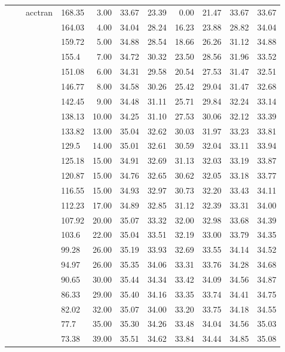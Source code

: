 \begin{longtable}{llllrrrrrrr}
   &  & acctran & 168.35 & 3.00 & 33.67 & 23.39 & 0.00 & 21.47 & 33.67 & 33.67 \\ 
   &  &  & 164.03 & 4.00 & 34.04 & 28.24 & 16.23 & 23.88 & 28.82 & 34.04 \\ 
   &  &  & 159.72 & 5.00 & 34.88 & 28.54 & 18.66 & 26.26 & 31.12 & 34.88 \\ 
   &  &  & 155.4 & 7.00 & 34.72 & 30.32 & 23.50 & 28.56 & 31.96 & 33.52 \\ 
   &  &  & 151.08 & 6.00 & 34.31 & 29.58 & 20.54 & 27.53 & 31.47 & 32.51 \\ 
   &  &  & 146.77 & 8.00 & 34.58 & 30.26 & 25.42 & 29.04 & 31.47 & 32.68 \\ 
   &  &  & 142.45 & 9.00 & 34.48 & 31.11 & 25.71 & 29.84 & 32.24 & 33.14 \\ 
   &  &  & 138.13 & 10.00 & 34.25 & 31.10 & 27.53 & 30.06 & 32.12 & 33.39 \\ 
   &  &  & 133.82 & 13.00 & 35.04 & 32.62 & 30.03 & 31.97 & 33.23 & 33.81 \\ 
   &  &  & 129.5 & 14.00 & 35.01 & 32.61 & 30.59 & 32.04 & 33.11 & 33.94 \\ 
   &  &  & 125.18 & 15.00 & 34.91 & 32.69 & 31.13 & 32.03 & 33.19 & 33.87 \\ 
   &  &  & 120.87 & 15.00 & 34.76 & 32.65 & 30.62 & 32.05 & 33.18 & 33.77 \\ 
   &  &  & 116.55 & 15.00 & 34.93 & 32.97 & 30.73 & 32.20 & 33.43 & 34.11 \\ 
   &  &  & 112.23 & 17.00 & 34.89 & 32.85 & 31.12 & 32.39 & 33.31 & 34.00 \\ 
   &  &  & 107.92 & 20.00 & 35.07 & 33.32 & 32.00 & 32.98 & 33.68 & 34.39 \\ 
   &  &  & 103.6 & 22.00 & 35.04 & 33.51 & 32.19 & 33.00 & 33.79 & 34.35 \\ 
   &  &  & 99.28 & 26.00 & 35.19 & 33.93 & 32.69 & 33.55 & 34.14 & 34.52 \\ 
   &  &  & 94.97 & 26.00 & 35.35 & 34.06 & 33.31 & 33.76 & 34.28 & 34.68 \\ 
   &  &  & 90.65 & 30.00 & 35.44 & 34.34 & 33.42 & 34.09 & 34.56 & 34.87 \\ 
   &  &  & 86.33 & 29.00 & 35.40 & 34.16 & 33.35 & 33.74 & 34.41 & 34.75 \\ 
   &  &  & 82.02 & 32.00 & 35.07 & 34.00 & 33.20 & 33.75 & 34.18 & 34.55 \\ 
   &  &  & 77.7 & 35.00 & 35.30 & 34.26 & 33.48 & 34.04 & 34.56 & 35.03 \\ 
   &  &  & 73.38 & 39.00 & 35.51 & 34.62 & 33.84 & 34.44 & 34.85 & 35.08 \\ 

\end{longtable}
